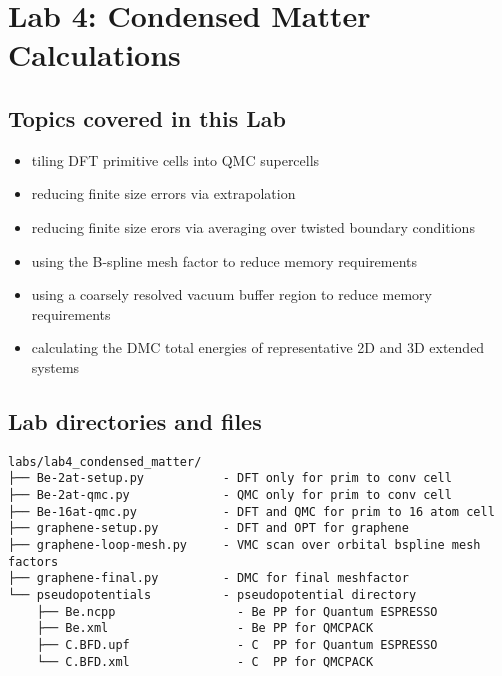 \chapter{Lab 4: Condensed Matter Calculations} %




\section{Topics covered in this Lab}
\begin{itemize}
  \item{tiling DFT primitive cells into QMC supercells}
  \item{reducing finite size errors via extrapolation}
  \item{reducing finite size erors via averaging over twisted boundary conditions}
  \item{using the B-spline mesh factor to reduce memory requirements}
  \item{using a coarsely resolved vacuum buffer region to reduce memory requirements}
  \item{calculating the DMC total energies of representative 2D and 3D extended systems}
\end{itemize}



\section{Lab directories and files}

\footnotesize
\begin{verbatim}
labs/lab4_condensed_matter/
├── Be-2at-setup.py           - DFT only for prim to conv cell
├── Be-2at-qmc.py             - QMC only for prim to conv cell
├── Be-16at-qmc.py            - DFT and QMC for prim to 16 atom cell
├── graphene-setup.py         - DFT and OPT for graphene
├── graphene-loop-mesh.py     - VMC scan over orbital bspline mesh factors
├── graphene-final.py         - DMC for final meshfactor
└── pseudopotentials          - pseudopotential directory
    ├── Be.ncpp                 - Be PP for Quantum ESPRESSO
    ├── Be.xml                  - Be PP for QMCPACK
    ├── C.BFD.upf               - C  PP for Quantum ESPRESSO
    └── C.BFD.xml               - C  PP for QMCPACK
\end{verbatim}
\normalsize

